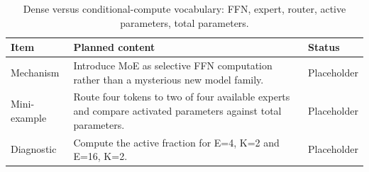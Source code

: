 \begin{table}[H]
\centering
\caption{Dense versus conditional-compute vocabulary: FFN, expert, router, active parameters, total parameters.}
\label{tab:ch01-conditional-compute-as-the-central-idea}
\begin{tabularx}{\textwidth}{p{}X p{}}
\toprule
Item & Planned content & Status \\
\midrule
Mechanism & Introduce MoE as selective FFN computation rather than a mysterious new model family. & Placeholder \\
Mini-example & Route four tokens to two of four available experts and compare activated parameters against total parameters. & Placeholder \\
Diagnostic & Compute the active fraction for E=4, K=2 and E=16, K=2. & Placeholder \\
\bottomrule
\end{tabularx}
\end{table}
